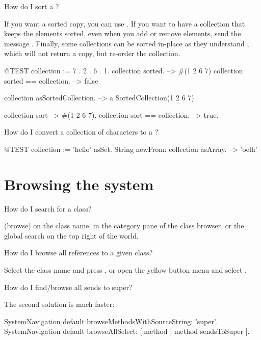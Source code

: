 \documentclass[a4paper,10pt,twoside]{book}
\begin{document}
\begin{faq}
How do I sort a ?
\end{faq}
\answer
If you want a sorted copy, you can use . 
If you want to have a collection that keeps the elements sorted, even when you add or remove elements, send the message .
Finally, some collections can be sorted in-place as they understand , which will not return a copy, but re-order the collection.

\begin{code}{@TEST}
collection := {7 . 2 . 6 . 1}.
collection sorted. --> #(1 2 6 7)
collection sorted == collection. --> false

collection asSortedCollection. --> a SortedCollection(1 2 6 7)

collection sort --> #(1 2 6 7).
collection sort == collection. --> true.
\end{code}

\begin{faq}
How do I convert a collection of characters to a ?
\end{faq}
\answer
\begin{code}{@TEST}
collection := 'hello' asSet.
String newFrom: collection asArray. --> 'oelh'
\end{code}

\section{Browsing the system}

\begin{faq}
How do I search for a class?
\end{faq}
\answer
{} (browse) on the class name,  in the category pane of the class browser, or the global search on the top right of the world.

\begin{faq}
How do I browse all references to a given class?
\end{faq}
\answer
Select the class name and press , or open the yellow button menu and select .

\begin{faq}
How do I find/browse all sends to super?
\end{faq}
\answer
The second solution is much faster:
\begin{code}{}
SystemNavigation default browseMethodsWithSourceString: 'super'.
SystemNavigation default browseAllSelect: [:method | method sendsToSuper ].
\end{code}
\end{document}
